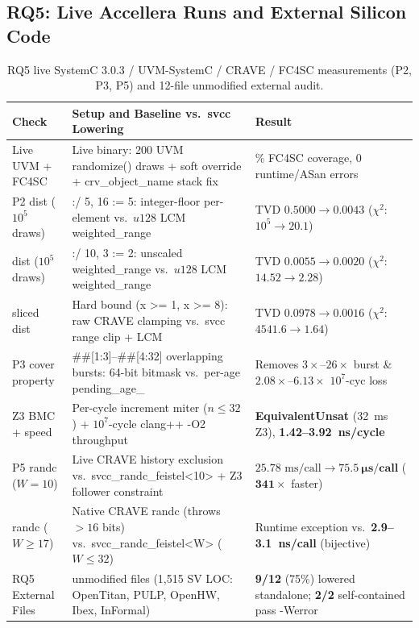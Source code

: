 \documentclass[conference]{IEEEtran}
\newcommand{\code}[1]{{\fontshape{n}\ttfamily #1}}
\begin{document}
\subsection{RQ5: Live Accellera Runs and External Silicon Code}

\begin{table}[t]
\centering
\caption{RQ5 live SystemC 3.0.3 / UVM-SystemC / CRAVE / FC4SC measurements (\code{P2}, \code{P3}, \code{P5}) and 12-file unmodified external audit.}
\label{tab:m4}
\footnotesize
\begin{tabularx}{\textwidth}{@{}>{\raggedright\arraybackslash}p{1.25in} >{\raggedright\arraybackslash}X >{\raggedright\arraybackslash}p{2.30in}@{}}
\toprule
\textbf{Check} & \textbf{Setup and Baseline vs.\ \code{svcc} Lowering} & \textbf{Result} \\
\midrule
Live UVM + FC4SC     & Live binary: 200 UVM \code{randomize()} draws + \code{soft} override + \code{crv\_object\_name} stack fix & 100.0\% FC4SC coverage, 0 runtime/ASan errors \\
\midrule
\code{P2} \code{dist} ($10^5$ draws) & \code{[0:15] :/ 5, 16 := 5}: integer-floor per-element vs.\ $u128$ LCM \code{weighted\_range} & TVD $0.5000 \rightarrow \mathbf{0.0043}$ ($\chi^2$: $10^5 \rightarrow \mathbf{20.1}$) \\
\code{P2} \code{dist} ($10^5$ draws) & \code{[0:2] :/ 10, 3 := 2}: unscaled \code{weighted\_range} vs.\ $u128$ LCM \code{weighted\_range} & TVD $0.0055 \rightarrow \mathbf{0.0020}$ ($\chi^2$: $14.52 \rightarrow \mathbf{2.28}$) \\
\code{P2} sliced \code{dist}        & Hard bound (\code{x >= 1}, \code{x >= 8}): raw CRAVE clamping vs.\ \code{svcc} range clip + LCM & TVD $0.0978 \rightarrow \mathbf{0.0016}$ ($\chi^2$: $4541.6 \rightarrow \mathbf{1.64}$) \\
\midrule
\code{P3} \code{cover property}     & \code{\#\#[1:3]}--\code{\#\#[4:32]} overlapping bursts: 64-bit bitmask vs.\ per-age \code{pending\_age\_} & Removes $3\times$--$26\times$ burst \& $2.08\times$--$6.13\times$ $10^7$-cyc loss \\
\code{P3} Z3 BMC + speed            & Per-cycle increment miter ($n \le 32$) + $10^7$-cycle \code{clang++ -O2} throughput & \textbf{\code{EquivalentUnsat}} (32~ms Z3), \textbf{1.42--3.92~ns/cycle} \\
\midrule
\code{P5} \code{randc} ($W=10$)     & Live CRAVE history exclusion vs.\ \code{svcc\_randc\_feistel<10>} + Z3 follower constraint & $25.78\text{ ms/call} \rightarrow \mathbf{75.5~\mu\text{s/call}}$ ($\mathbf{341\times}$ faster) \\
\code{P5} \code{randc} ($W \ge 17$) & Native CRAVE \code{randc} (throws $>16$ bits) vs.\ \code{svcc\_randc\_feistel<W>} ($W \le 32$) & Runtime exception vs.\ \textbf{2.9--3.1~ns/call} (bijective) \\
\midrule
RQ5 External Files                  & 12 unmodified files (1,515 SV LOC: OpenTitan, PULP, OpenHW, Ibex, \code{InFormal}) & \textbf{9/12} (75\%) lowered standalone; \textbf{2/2} self-contained pass \code{-Werror} \\
\bottomrule
\end{tabularx}
\end{table}
\end{document}

